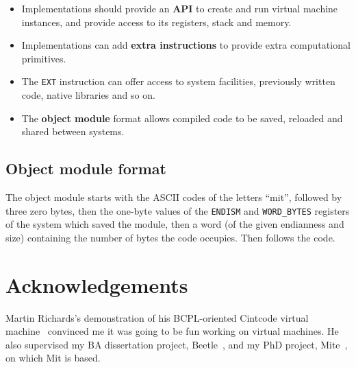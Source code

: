 \documentclass[a4paper]{article}
\begin{document}
\begin{itemize}
\item Implementations should provide an \textbf{API} to create and run virtual machine instances, and provide access to its registers, stack and memory.
\item Implementations can add \textbf{extra instructions} to provide extra computational primitives.
\item The {\tt EXT} instruction can offer access to system facilities, previously written code, native libraries and so on.
\item The \textbf{object module} format allows compiled code to be saved, reloaded and shared between systems.
\end{itemize}


\subsection{Object module format}
\label{object}

The object module starts with the ASCII codes of the letters
``mit'', followed by three zero bytes, then the one-byte values of
the {\tt ENDISM} and {\tt WORD\_BYTES} registers of the system which saved the module, then a word (of the given endianness and size) containing the number of bytes the code occupies. Then follows the code.


\section*{Acknowledgements}

Martin Richards's demonstration of his BCPL-oriented Cintcode virtual machine~\cite{cintweb}
convinced me it was going to be fun working on virtual machines. He also supervised my BA dissertation project, Beetle~\cite{beetledis}, and my PhD project, Mite~\cite{mite0}, on which Mit is based.



\end{document}
